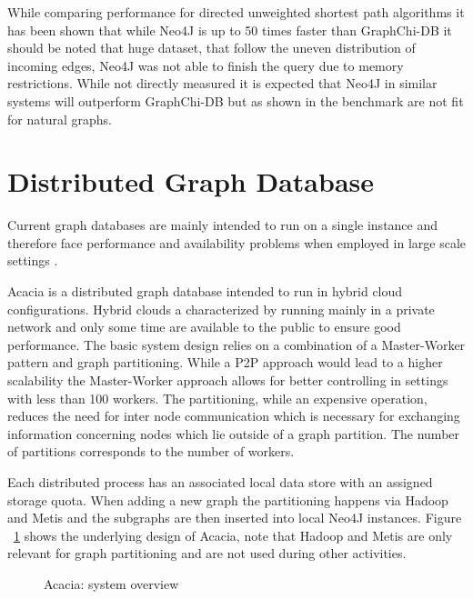 \documentclass{sig-alternate}
\begin{document}
While comparing performance for directed unweighted shortest path algorithms it has been shown that while Neo4J
is up to 50 times faster than GraphChi-DB it should be noted that huge dataset, that follow the uneven distribution 
of incoming edges, Neo4J was not able to finish the query due to memory restrictions.
While not directly measured it is expected that Neo4J in similar systems will outperform 
GraphChi-DB but as shown in the benchmark are not fit for natural graphs.

\section{Distributed Graph Database}
Current graph databases are mainly intended to run on a single instance and therefore
face performance and availability problems when employed in large scale settings \cite{dayarathna2012xgdbench} 
\cite{dayarathna2013graph}.

Acacia \cite{dayarathna2014towards} is a distributed graph database intended to run in hybrid cloud configurations.
Hybrid clouds a characterized by running mainly in a private network and only
some time are available to the public to ensure good performance.
The basic system design relies on a combination of a Master-Worker pattern 
and graph partitioning. While a P2P approach would lead to a higher scalability
the Master-Worker approach allows for better controlling in settings with less than 100 workers.
The partitioning, while an expensive operation, reduces the need for inter node communication
which is necessary for exchanging information concerning nodes which lie outside of a graph partition.
The number of partitions corresponds to the number of workers.

Each distributed process has an associated local data store with an assigned storage quota.
When adding a new graph the partitioning happens via Hadoop and Metis and the subgraphs are then inserted into local
Neo4J instances. Figure ~\ref{fig:distgraph} shows the underlying design of Acacia, note that Hadoop and Metis 
are only relevant for graph partitioning and are not used during other 
activities.

\begin{figure}[H]
\centering
{}
\caption{Acacia: system overview \cite{dayarathna2014towards}}
\label{fig:distgraph}
\end{figure}
\end{document}
